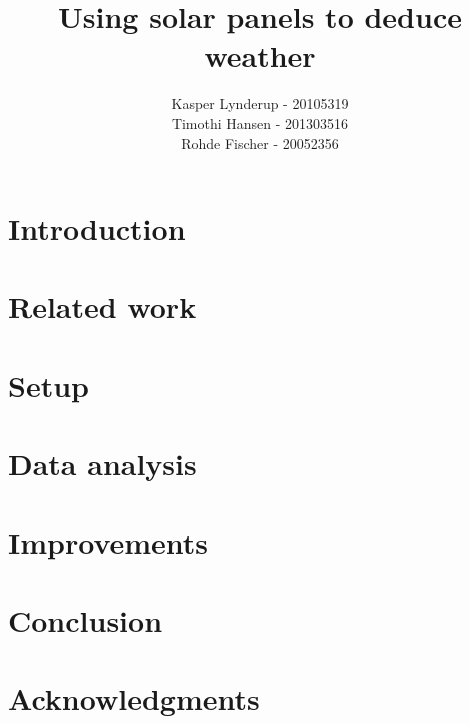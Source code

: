 \documentclass[a4paper]{article}
\makeatletter
\newcommand\csAdvisor[1]{\renewcommand\@csAdvisor{#1}}
\newcommand\@csAdvisor{\@latex@error{No \noexpand\csAdvisor given}\@ehc}
\makeatother
\begin{document}
\author{Kasper Lynderup - 20105319\\Timothi Hansen - 201303516\\Rohde Fischer - 20052356}
\csAdvisor{Niels Olof Bouvin}
\title{Using solar panels to deduce weather}
\pagestyle{empty}
\maketitle


\pagestyle{plain}
\setcounter{page}{1}

\tableofcontents
{}
\setcounter{secnumdepth}{2}


\section{Introduction}


\section{Related work}


\section{Setup}


\section{Data analysis}


\section{Improvements}


\section{Conclusion}



\section{Acknowledgments}
\end{document}
